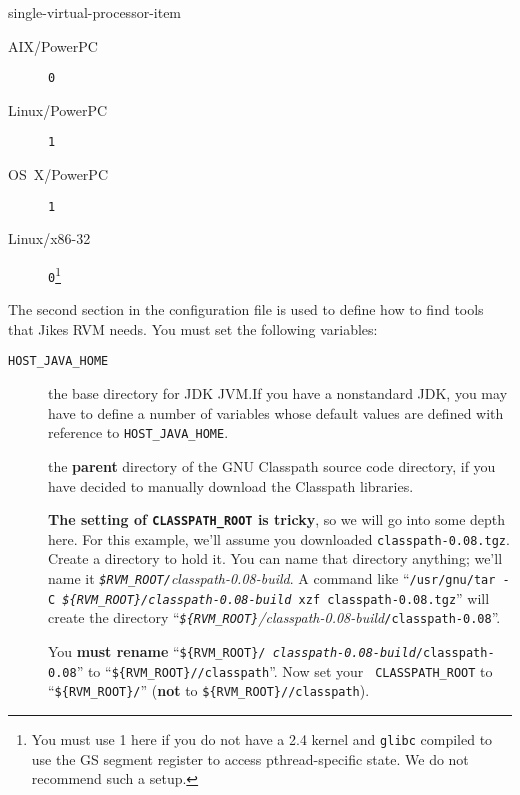 \begin{enumerate}
\begin{Label}{single-virtual-processor-item}
\begin{description}
\item[AIX/PowerPC] \texttt{0 }
\item[Linux/PowerPC] \texttt{1}
\item[OS~X/PowerPC] \texttt{1}
\item[Linux/x86-32] \texttt{0}\footnote{You must use 1 here if you do not
have a 2.4 kernel and \texttt{glibc} compiled to use the GS segment register to
access pthread-specific state.  We do not recommend such a setup.}
\end{description}                
\end{Label}

The second section in the configuration file is used to define how to
find tools that Jikes RVM needs. You must set the following variables:

\begin{description}

\item[\texttt{HOST\_JAVA\_HOME}] the base directory for JDK JVM.\@  If you
have a nonstandard JDK, you may have to define a number of variables
whose default values are defined with reference to \texttt{HOST\_JAVA\_HOME}.

\label{manual-classpath-root}%
\item[] the {\bf parent} directory of the GNU
  Classpath source code directory, if you have decided to manually
  download the Classpath libraries. 

{\bf The setting of \texttt{CLASSPATH\_ROOT} is tricky}, so we will go
into some depth here.  For this example, we'll assume you downloaded
\texttt{classpath-0.08.tgz}.  Create a directory to hold it.  You can
name that directory anything; we'll name it 
{\it \texttt{\$RVM\_\-ROOT/}classpath-0.08-build}.  
A command like 
``\texttt{/usr/gnu/tar -C
  {\rm \it \texttt{\$\{RVM\_\-ROOT\}/}\-classpath-0.08-build} xzf classpath-0.08.tgz}''
will create the directory
``{\rm \it \texttt{\$\{RVM\_\-ROOT\}}/\-class\-path-0.08-build}\texttt{/\-class\-path-0.08}''.  

You {\bf must rename} ``\texttt{\$\{RVM\_\-ROOT\}/{\it
    class\-path-0.08-build}/\-class\-path-0.08}'' to ``\texttt{\$\{RVM\_\-ROOT\}//\-class\-path}''.  Now set your {\tt
  CLASS\-PATH\_\-ROOT} to ``\texttt{\$\{RVM\_\-ROOT\}/}''
({\bf not} to \texttt{\$\{RVM\_\-ROOT\}//\-class\-path}).



\end{description}
\end{enumerate}
